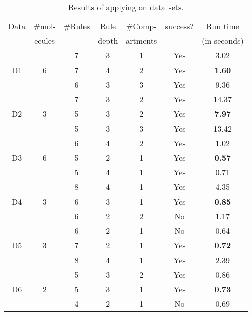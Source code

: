 \begin{table}[t]
  \centering
  \scriptsize
  \begin{tabular}[t]{|c|c|c|c|c|c|c|}\hline
    Data & \#mol- & \#Rules & Rule  & \#Comp- & success? & Run time \\
         & ecules   &         & depth & artments &          & (in seconds) \\\hline
         &   & 7  & 3 & 1 & Yes &  3.02 \\\cline{3-7}
    D1   & 6 & 7  & 4 & 2 & Yes & {\bf 1.60}  \\\cline{3-7}
         &   & 6  & 3 & 3 & Yes & 9.36  \\\hline
         
         &   & 7  & 3 & 2 & Yes & 14.37  \\\cline{3-7}
    D2   & 3 & 5  & 3 & 2 & Yes & {\bf 7.97}  \\\cline{3-7}
         &   & 5  & 3 & 3 & Yes  &  13.42 \\\hline
         
         &   & 6  & 4  & 2  & Yes & 1.02  \\\cline{3-7}
    D3   & 6 & 5  & 2 & 1 & Yes & {\bf 0.57}  \\\cline{3-7}
         &   & 5  & 4 & 1 & Yes  &  0.71 \\\hline
         
         &   & 8  & 4  & 1  & Yes & 4.35  \\\cline{3-7}
    D4   & 3 & 6  & 3 & 1 & Yes & {\bf 0.85}  \\\cline{3-7}
         &   & 6  & 2 & 2 & No  &  1.17 \\\hline
         
         &   & 6  & 2 & 1 & No &  0.64 \\\cline{3-7}
    D5   & 3 & 7  & 2 & 1 & Yes & {\bf 0.72}  \\\cline{3-7}
         &   & 8  & 4 & 1 & Yes  &  2.39 \\\hline
         
         &   & 5  & 3 & 2 & Yes &  0.86 \\\cline{3-7}
    D6   & 2 & 5  & 3 & 1 & Yes & {\bf 0.73}  \\\cline{3-7}
         &   & 4  & 2 & 1 & No  & 0.69  \\\hline
         
    


  \end{tabular}
  \caption{Results of applying \ourtool on data sets.
  }
  \label{tab:results}
\end{table}
